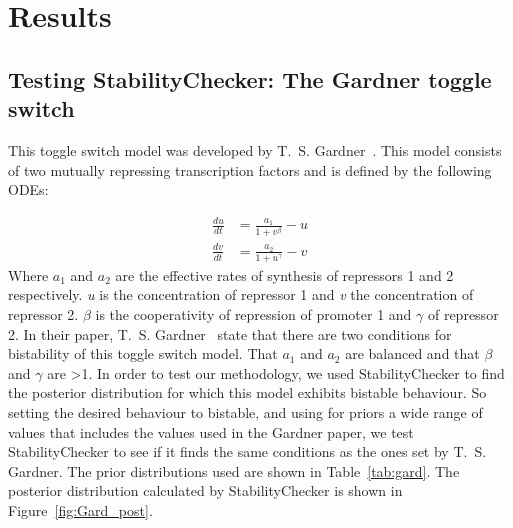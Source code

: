 \section{Results}
\subsection{Testing StabilityChecker: The Gardner toggle switch}

This toggle switch model was developed by T.~S. Gardner~\autocite{Gardner:2000vha}. This model consists of two mutually repressing transcription factors and is defined by the following ODEs:

\begin{align}
\frac{du}{dt} &= \frac{a_1}{1+v^{\beta}} - u \label{eq:gard_1} \\
\frac{dv}{dt} &= \frac{a_2}{1+u^{\gamma }} - v\label{eq:gard_2}
\end{align}
Where $a_1$ and $a_2$ are the effective rates of synthesis of repressors 1 and 2 respectively. \textit{u} is the concentration of repressor 1 and \textit{v} the concentration of repressor 2. \textit{$\beta$} is the cooperativity of repression of promoter 1 and \textit{$\gamma$} of repressor 2. In their paper,  T.~S. Gardner~\autocite{Gardner:2000vha} state that there are two conditions for bistability of this toggle switch model. That $a_1$ and $a_2$ are balanced and that $\beta$ and $\gamma$ are \textgreater 1. In order to test our methodology, we used StabilityChecker to find the posterior distribution for which this model exhibits bistable behaviour. So setting the desired behaviour to bistable, and using for priors a wide range of values that includes the values used in the Gardner paper, we test StabilityChecker to see if it finds the same conditions as the ones set by T.~S. Gardner. The prior distributions used are shown in Table~\ref{tab:gard}. The posterior distribution calculated by StabilityChecker is shown in Figure~\ref{fig:Gard_post}.

